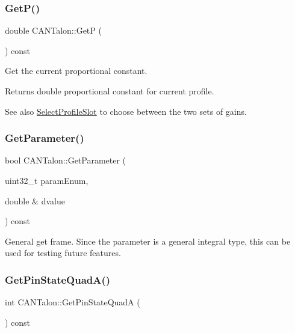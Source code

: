 \subsubsection{\texorpdfstring{Get\+P()}{GetP()}}
{\footnotesize\ttfamily double C\+A\+N\+Talon\+::\+GetP (\begin{DoxyParamCaption}{ }\end{DoxyParamCaption}) const\hspace{0.3cm}{\ttfamily [override]}}

Get the current proportional constant.

\begin{DoxyReturn}{Returns}
double proportional constant for current profile. 
\end{DoxyReturn}
\begin{DoxySeeAlso}{See also}
\hyperlink{class_c_a_n_talon_a0f478462884ed5e541179821c44b724f}{Select\+Profile\+Slot} to choose between the two sets of gains. 
\end{DoxySeeAlso}
\mbox{\label{class_c_a_n_talon_ac3fc867de74a9174eab5c1aaa3ddb3b5}} 
\subsubsection{\texorpdfstring{Get\+Parameter()}{GetParameter()}}
{\footnotesize\ttfamily bool C\+A\+N\+Talon\+::\+Get\+Parameter (\begin{DoxyParamCaption}\item[{uint32\+\_\+t}]{param\+Enum,  }\item[{double \&}]{dvalue }\end{DoxyParamCaption}) const}

General get frame. Since the parameter is a general integral type, this can be used for testing future features. \mbox{\label{class_c_a_n_talon_ac591175f87e34f153118cb507c132c8f}} 
\subsubsection{\texorpdfstring{Get\+Pin\+State\+Quad\+A()}{GetPinStateQuadA()}}
{\footnotesize\ttfamily int C\+A\+N\+Talon\+::\+Get\+Pin\+State\+QuadA (\begin{DoxyParamCaption}{ }\end{DoxyParamCaption}) const}

